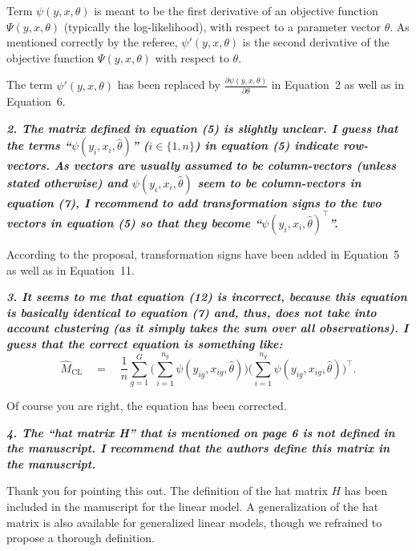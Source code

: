 \documentclass[10pt,a4paper]{article}
\begin{document}
Term $\psi(y, x, \theta)$ is meant to be the first derivative of an objective function $\Psi(y, x, \theta)$ (typically the log-likelihood), with respect to a parameter vector $\theta$. As mentioned correctly by the referee, $\psi'(y, x, \theta)$ is the second derivative of the objective function $\Psi(y, x, \theta)$ with respect to $\theta$.

The term $\psi'(y, x, \theta)$ has been replaced by $\frac{\partial \psi(y, x, \theta)}{\partial\theta}$ in Equation~2 as well as in Equation~6.

\medskip

\textbf{\textit{2. The matrix defined in equation (5) is slightly unclear. I guess that the terms ``$\psi(y_i, x_i, \hat\theta)$'' ($i \in \{1, n\}$) in equation (5) indicate row-vectors. As vectors are usually assumed to be column-vectors (unless stated otherwise) and $\psi(y_i, x_i, \hat\theta)$ seem to be column-vectors in
equation (7), I recommend to add transformation signs to the two vectors in equation (5)
so that they become ``$\psi(y_i, x_i, \hat\theta)^\top$''.}}

\medskip

According to the proposal, transformation signs have been added in Equation~5 as well as in Equation~11. 

\medskip

\textbf{\textit{3. It seems to me that equation (12) is incorrect, because this equation is basically identical
to equation (7) and, thus, does not take into account clustering (as it simply takes the
sum over all observations). I guess that the correct equation is something like:
\begin{equation}
  \hat M_\mathrm{CL} \quad = \quad \frac{1}{n} \sum_{g = 1}^G\bigg(\sum_{i = 1}^{n_{g}}\psi(y_{ig}, x_{ig}, \hat \theta) \bigg) \bigg(\sum_{i = 1}^{n_{g}} \psi(y_{ig}, x_{ig}, \hat \theta) \bigg)^\top.
\end{equation}}}

\medskip

Of course you are right, the equation has been corrected. 

\medskip

\textbf{\textit{4. The ``hat matrix H'' that is mentioned on page 6 is not defined in the manuscript. I
recommend that the authors define this matrix in the manuscript.}}

\medskip

Thank you for pointing this out. The definition of the hat matrix $H$ has been included in the manuscript for the linear model.
A generalization of the hat matrix is also available for generalized linear models, though we refrained to propose a thorough definition.
\end{document}
